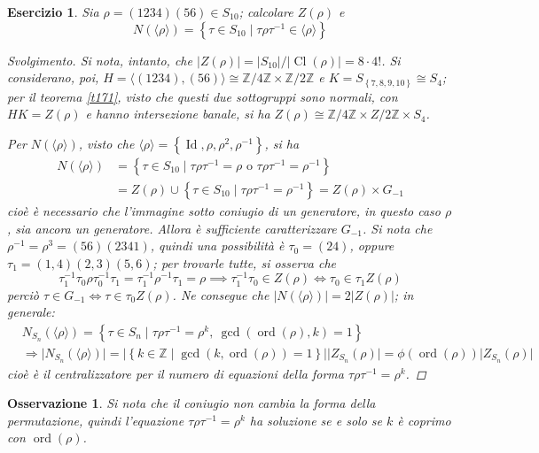 \documentclass[12pt]{scrartcl}
\theoremstyle{style}
\newtheorem{osservazione}{Osservazione}[section]
\newtheorem{esercizio}{Esercizio}[section]
\newenvironment{svolgimento}{\renewcommand\qedsymbol{$\blacksquare$}\begin{proof}[Svolgimento]}{\end{proof}}
\numberwithin{equation}{subsection}
\begin{document}
\begin{esercizio}
Sia $\rho = (1234)(56) \in S_{10}$; calcolare $Z(\rho )$ e 
\[
N(\langle \rho  \rangle)= \left\{ \tau \in S_{10}  \mid \tau \rho \tau ^{-1}\in \langle \rho  \rangle\right\} 
\] 
\begin{svolgimento}
	Si nota, intanto, che $\lvert Z(\rho ) \rvert = \lvert S_{10} \rvert / \lvert \operatorname{Cl} (\rho ) \rvert = 8 \cdot 4!$.
	Si considerano, poi, $H = \langle (1234),(56) \rangle\cong \mathbb{Z}/4\mathbb{Z} \times \mathbb{Z}/2\mathbb{Z}$ e $K = S_{\left\{ 7,8,9,10 \right\} } \cong S_4$; per il teorema \ref{t171}, visto che questi due sottogruppi sono normali, con $HK = Z(\rho )$ e hanno intersezione banale, si ha $Z(\rho ) \cong \mathbb{Z}/4\mathbb{Z} \times Z / 2\mathbb{Z} \times S_4$.

	Per $N(\langle \rho  \rangle)$, visto che $\langle \rho  \rangle=\left\{ \operatorname{Id} , \rho ,\rho ^2, \rho ^{-1} \right\} $, si ha
	\[
		\begin{split}
			N(\langle \rho  \rangle) &= \left\{ \tau  \in S_{10}  \mid  \tau \rho \tau ^{-1}= \rho  \text{ o } \tau \rho \tau ^{-1}=\rho ^{-1}\right\} \\
						 &= Z(\rho )\cup \left\{ \tau \in S_{10}  \mid \tau \rho \tau ^{-1}=\rho ^{-1}\right\} = Z(\rho) \times G_{-1}
		\end{split}
	\] 
	cio\`e \`e necessario che l'immagine sotto coniugio di un generatore, in questo caso $\rho $, sia ancora un generatore.
	Allora \`e sufficiente caratterizzare $G_{-1} $.
	Si nota che $\rho ^{-1}= \rho ^{3}= (56)(2341)$, quindi una possibilit\`a \`e $\tau_0 = (24)$, oppure $\tau_1= (1,4)(2,3)(5,6)$; per trovarle tutte, si osserva che
	\[
	\tau _1^{-1}\tau _0 \rho \tau_0 ^{-1}\tau _1 = \tau _1^{-1}\rho ^{-1}\tau _1= \rho \implies \tau _1^{-1}\tau _0 \in Z(\rho ) \iff \tau _0 \in \tau _1 Z(\rho )
	\] 
	perci\`o $\tau \in G_{-1} \iff \tau \in \tau _0 Z(\rho )$. 
	Ne consegue che $\lvert N(\langle \rho  \rangle) \rvert = 2 \lvert Z(\rho ) \rvert $; in generale:
	\begin{equation}
		\begin{split}
			&N_{S_n} (\langle \rho  \rangle) = \left\{ \tau  \in S_n  \mid \tau \rho \tau ^{-1}=\rho ^{k}, \ \operatorname{gcd}(\operatorname{ord}(\rho ) ,k) =1 \right\} \\
			&\Rightarrow \lvert N_{S_n} (\langle \rho \rangle ) \rvert = \lvert \left\{ k \in \mathbb{Z} \mid \operatorname{gcd}(k,\operatorname{ord}(\rho ) ) =1 \right\}  \rvert \lvert Z_{S_n} (\rho ) \rvert =\phi (\operatorname{ord}(\rho ) ) \lvert Z_{S_n} (\rho ) \rvert 
		\end{split}
	\end{equation}
	cio\`e \`e il centralizzatore per il numero di equazioni della forma $\tau \rho \tau ^{-1}= \rho ^k$.
\end{svolgimento}
\end{esercizio}
\begin{osservazione}
	Si nota che il coniugio non cambia la forma della permutazione, quindi l'equazione $\tau \rho \tau ^{-1} = \rho ^k$ ha soluzione se e solo se $k$ \`e coprimo con $\operatorname{ord}(\rho ) $.
\end{osservazione}
\end{document}
